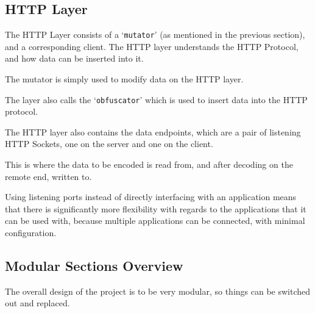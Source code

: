 \subsection{HTTP Layer}
The HTTP Layer consists of a `\texttt{mutator}' (as mentioned in the previous section), and a corresponding client. The HTTP layer understands the HTTP Protocol, and how data can be inserted into it.\par
The mutator is simply used to modify data on the HTTP layer.\par
The layer also calls the `\texttt{obfuscator}' which is used to insert data into the HTTP protocol.\par
The HTTP layer also contains the data endpoints, which are a pair of listening HTTP Sockets, one on the server and one on the client.\par
This is where the data to be encoded is read from, and after decoding on the remote end, written to.
\begin{center}
\end{center}
Using listening ports instead of directly interfacing with an application means that there is significantly more flexibility with regards to the applications that it can be used with, because multiple applications can be connected, with minimal configuration.

\subsection{Modular Sections Overview}
The overall design of the project is to be very modular, so things can be switched out and replaced.

